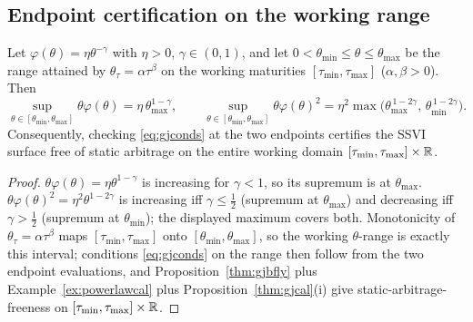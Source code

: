 \subsection{Endpoint certification on the working range}

\begin{theorem}\label{lem:range}
Let $\varphi(\theta)=\eta\theta^{-\gamma}$ with $\eta>0$, $\gamma\in(0,1)$, and let
$0<\theta_{\min}\le\theta\le\theta_{\max}$ be the range attained by
$\theta_\tau=\alpha\tau^{\beta}$ on the working maturities $[\tau_{\min},\tau_{\max}]$
($\alpha,\beta>0$). Then
\[
\sup_{\theta\in[\theta_{\min},\theta_{\max}]}\theta\varphi(\theta)
=\eta\,\theta_{\max}^{1-\gamma},
\qquad
\sup_{\theta\in[\theta_{\min},\theta_{\max}]}\theta\varphi(\theta)^{2}
=\eta^{2}\max\bigl(\theta_{\max}^{\,1-2\gamma},\,\theta_{\min}^{\,1-2\gamma}\bigr).
\]
Consequently, checking \eqref{eq:gjconds} at the two endpoints certifies the SSVI surface free
of static arbitrage on the entire working domain $[\tau_{\min},\tau_{\max}]\times\mathbb{R}$.
\end{theorem}

\begin{proof}
$\theta\varphi(\theta)=\eta\theta^{1-\gamma}$ is increasing for $\gamma<1$, so its supremum is
at $\theta_{\max}$. $\theta\varphi(\theta)^2=\eta^2\theta^{1-2\gamma}$ is increasing iff
$\gamma\le\tfrac12$ (supremum at $\theta_{\max}$) and decreasing iff $\gamma>\tfrac12$
(supremum at $\theta_{\min}$); the displayed maximum covers both. Monotonicity of
$\theta_\tau=\alpha\tau^\beta$ maps $[\tau_{\min},\tau_{\max}]$ onto
$[\theta_{\min},\theta_{\max}]$, so the working $\theta$-range is exactly this interval;
conditions \eqref{eq:gjconds} on the range then follow from the two endpoint evaluations, and
Proposition~\ref{thm:gjbfly} plus Example~\ref{ex:powerlawcal} plus Proposition~\ref{thm:gjcal}(i)
give static-arbitrage-freeness on $[\tau_{\min},\tau_{\max}]\times\mathbb{R}$.
\end{proof}


